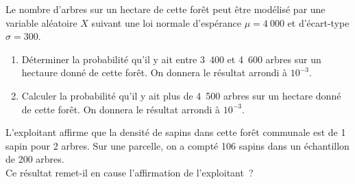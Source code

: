 \medbreak
{}
\smallbreak
Le nombre d'arbres sur un hectare de cette forêt peut être modélisé par une variable aléatoire $X$ suivant une loi normale d'espérance $\mu=4~000$ et d'écart-type $\sigma=300$.
\begin{enumerate}
     \item Déterminer la probabilité qu'il y ait entre 3~400 et 4~600 arbres sur un hectaure donné de cette forêt. On donnera le résultat arrondi à $10^{-3}$.
     \item Calculer la probabilité qu'il y ait plus de 4~500 arbres sur un hectare donné de cette forêt.
     On donnera le résultat arrondi à $10^{-3}$.
\end{enumerate}
\medbreak
{}
\smallbreak
L'exploitant affirme que la densité de sapins dans cette forêt communale est de 1 sapin pour 2 arbres.
\smallbreak
Sur une parcelle, on a compté 106 sapins dans un échantillon de 200 arbres.\\
Ce résultat remet-il en cause l'affirmation de l'exploitant~?
\par

